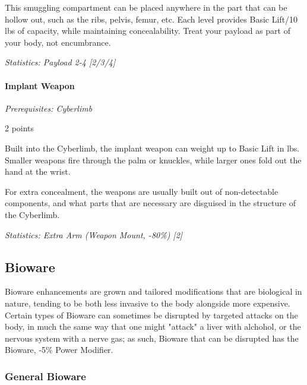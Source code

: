 \begin{multicols*}{3}
	This smuggling compartment can be placed anywhere in the part that can be hollow out, such as the ribs, pelvis, femur, etc. Each level provides Basic Lift/10 lbs of capacity, while maintaining concealability. Treat your payload as part of your body, not encumbrance. 
	
	\textit{\textcolor{OliveGreen}{Statistics: Payload 2-4 [2/3/4]}}
	
	\paragraph{Implant Weapon}
	\textit{Prerequisites: Cyberlimb}
	\begin{flushright}
		2 points
	\end{flushright}
	
	Built into the Cyberlimb, the implant weapon can weight up to Basic Lift in lbs. Smaller weapons fire through the palm or knuckles, while larger ones fold out the hand at the wrist.
	
	For extra concealment, the weapons are usually built out of non-detectable components, and what parts that are necessary are disguised in the structure of the Cyberlimb. 
	
	\textit{\textcolor{OliveGreen}{Statistics: Extra Arm (Weapon Mount, -80\%) [2]}}
	
	\subsection{Bioware}
	
	Bioware enhancements are grown and tailored modifications that are biological in nature, tending to be both less invasive to the body alongside more expensive. Certain types of Bioware can sometimes be disrupted by targeted attacks on the body, in much the same way that one might "attack" a liver with alchohol, or the nervous system with a nerve gas; as such, Bioware that can be disrupted has the Bioware, -5\% Power Modifier.
	
	\subsubsection{General Bioware}
	

\end{multicols*}
